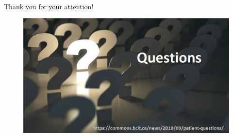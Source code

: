    

\begin{frame}{Thank you for your attention!}
  
    \begin{figure}[h]
    \centering
    \includegraphics[width=12cm]{Figures/question_marks.png}
    \end{figure}
   
\end{frame}


